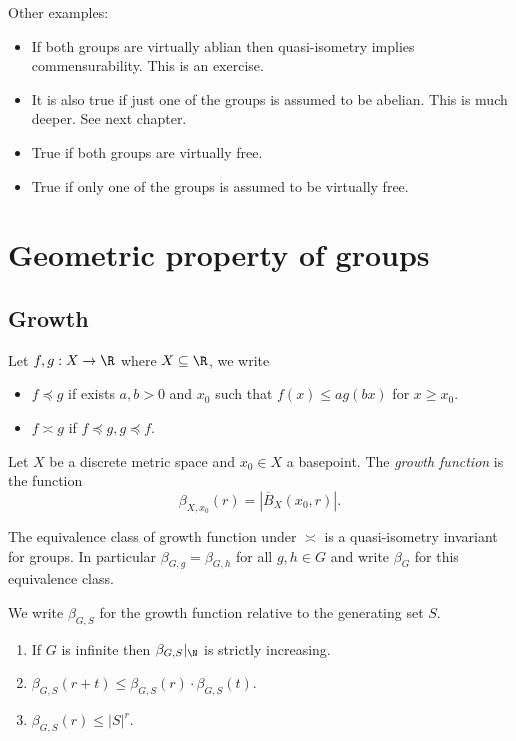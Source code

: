 \documentclass[a4paper]{article}
\begin{document}
Other examples:
\begin{itemize}
\item If both groups are virtually ablian then quasi-isometry implies commensurability. This is an exercise.
\item It is also true if just one of the groups is assumed to be abelian. This is much deeper. See next chapter.
\item True if both groups are virtually free.
\item True if only one of the groups is assumed to be virtually free.
\end{itemize}

\section{Geometric property of groups}

\subsection{Growth}

\begin{notation}
  Let \(f, g: X \to \R\) where \(X \subseteq \R\), we write
  \begin{itemize}
  \item \(f \preceq g\) if exists \(a, b > 0\) and \(x_0\) such that \(f(x) \leq a g(bx)\) for \(x \geq x_0\).
  \item \(f \asymp g\) if \(f \preceq g, g \preceq f\).
  \end{itemize}
\end{notation}

\begin{definition}
  Let \(X\) be a discrete metric space and \(x_0 \in X\) a basepoint. The \emph{growth function} is the function
  \[
    \beta_{X, x_0}(r) = |\overline B_X(x_0, r)|.
  \]
\end{definition}

\begin{lemma}
  The equivalence class of growth function under \(\asymp\) is a quasi-isometry invariant for groups. In particular \(\beta_{G, g} = \beta_{G, h}\) for all \(g, h \in G\) and write \(\beta_G\) for this equivalence class.
\end{lemma}

We write \(\beta_{G, S}\) for the growth function relative to the generating set \(S\).

\begin{proposition}\leavevmode
  \begin{enumerate}
  \item If \(G\) is infinite then \(\beta_{G, S}|_\N\) is strictly increasing.
  \item \(\beta_{G, S}(r + t) \leq \beta_{G, S}(r) \cdot \beta_{G, S}(t)\).
  \item \(\beta_{G, S}(r) \leq |S|^r\).
  \end{enumerate}
\end{proposition}
\end{document}
